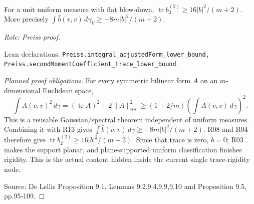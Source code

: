 \begin{lemma}
\label{lem:trace-rigidity}






For a unit uniform measure with flat blow-down, $\operatorname{tr}b_2^{(2)}\geq16|b|^2/(m+2)$. More precisely $\int\widehat b(v,v)\,d\gamma_V\geq-8m|b|^2/(m+2)$.
\par\emph{Role: Preiss proof.}
\par Lean declarations: \texttt{Preiss.integral\_adjustedForm\_lower\_bound, Preiss.secondMomentCoefficient\_trace\_lower\_bound}.
\end{lemma}
\begin{proof}[Planned proof obligations]

For every symmetric bilinear form $A$ on an $m$-dimensional Euclidean space,
\[
 \int A(v,v)^2\,d\gamma=(\operatorname{tr}A)^2+
 2\|A\|_{\mathrm{HS}}^2
 \geq(1+2/m)\left(\int A(v,v)\,d\gamma\right)^2.
\]
This is a reusable Gaussian/spectral theorem independent of uniform measures.
Combining it with R13 gives
$\int\widehat b(v,v)\,d\gamma\geq-8m|b|^2/(m+2)$.
R08 and R04 therefore give
$\operatorname{tr}b_2^{(2)}\geq16|b|^2/(m+2)$.
Since that trace is zero, $b=0$; R03 makes the support planar, and plane-supported
uniform classification finishes rigidity. This is the actual content hidden
inside the current single trace-rigidity node.
\par Source: De Lellis Proposition 9.1, Lemmas 9.2,9.4,9.9,9.10 and Proposition 9.5, pp.95-109.
\end{proof}

